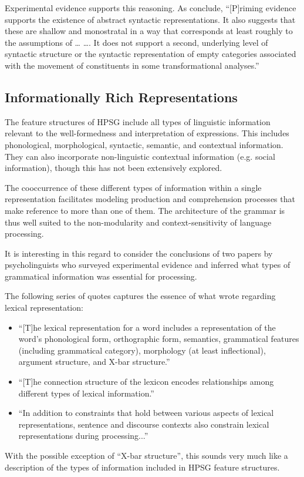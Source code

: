 \documentclass[a4paper]{article}
\begin{document}
Experimental evidence supports this reasoning.  As \citet{BraniganPickering2017} conclude,
``[P]riming evidence supports the existence of abstract syntactic representations. It also suggests
that these are shallow and monostratal in a way that corresponds at least roughly to the assumptions
of \ldots{} \citet{ps2} \ldots{}. It does not support a second, underlying level of syntactic
structure or the syntactic representation of empty categories associated with the movement of
constituents in some transformational analyses.''

\subsection{Informationally Rich Representations}

The feature structures of HPSG include all
types of linguistic information relevant to the well-formedness and interpretation
of expressions. This includes phonological, morphological, syntactic, semantic, and contextual information.  They can also incorporate non-linguistic contextual information (e.g. social information), though this has not been extensively explored.

The cooccurrence of these different types of information within a single representation facilitates modeling production and comprehension processes that make reference to more than one of them.  The architecture of the grammar is thus well suited to the non-modularity and context-sensitivity of language processing.  

It is interesting in this regard to consider the conclusions of two papers by psycholinguists who surveyed experimental evidence and inferred what types of grammatical information was essential for processing.  

The following series of quotes captures the essence of what \citet{MPS94a-u} wrote regarding lexical representation:
\begin{itemize} 
\item ``[T]he lexical
representation for a word includes a representation of the
word's phonological form, orthographic form, semantics,
grammatical features (including grammatical category), morphology
(at least inflectional), argument structure, and X-bar
structure.''
\item ``[T]he connection
structure of the lexicon encodes relationships among
different types of lexical information.''
\item
``In addition to constraints that hold between various aspects
of lexical representations, sentence and discourse contexts also
constrain lexical representations during processing...''
\end{itemize}
With the possible exception of ``X-bar structure'', this sounds very much like a description of the types of information included in HPSG feature structures.
\end{document}
